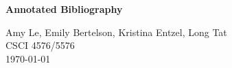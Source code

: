 \documentclass[12pt]{article}
\begin{document}
\begin{center}
   {\Large\textbf{Annotated Bibliography}}
\medskip

   {\large   Amy Le, Emily Bertelson, Kristina Entzel, Long Tat\\
	CSCI 4576/5576\\
\vspace{2mm} \today
   }
\end{center}
\nocite{*}



\end{document}
